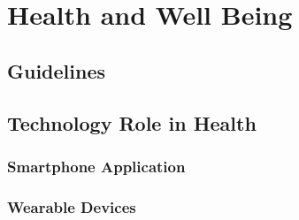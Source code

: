 \setcounter{section}{0}
\section{Health and Well Being}
\subsection{Guidelines}
\subsection{Technology Role in Health} 
\subsubsection{Smartphone Application}
\subsubsection{Wearable Devices}